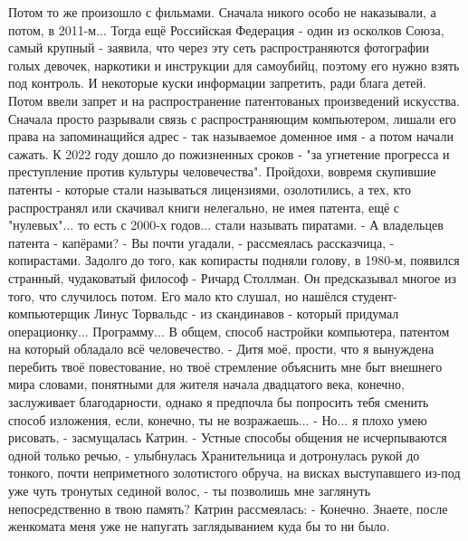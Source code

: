 Потом то же произошло с фильмами. Сначала никого особо не наказывали, а потом, в 2011-м... Тогда ещё Российская Федерация - один из осколков Союза, самый крупный - заявила, что через эту сеть распространяются фотографии голых девочек, наркотики и инструкции для самоубийц, поэтому его нужно взять под контроль. И некоторые куски информации запретить, ради блага детей. Потом ввели запрет и на распространение патентованых произведений искусства. Сначала просто разрывали связь с распространяющим компьютером, лишали его права на запоминащийся адрес - так называемое доменное имя - а потом начали сажать. К 2022 году дошло до пожизненных сроков - "за угнетение прогресса и преступление против культуры человечества". Пройдохи, вовремя скупившие патенты - которые стали называться лицензиями, озолотились, а тех, кто распространял или скачивал книги нелегально, не имея патента, ещё с "нулевых"... то есть с 2000-х годов... стали называть пиратами.
 - А владельцев патента - капёрами?
 - Вы почти угадали, - рассмеялась рассказчица, - копирастами. Задолго до того, как копирасты подняли голову, в 1980-м, появился странный, чудаковатый философ - Ричард Столлман. Он предсказывал многое из того, что случилось потом. Его мало кто слушал, но нашёлся студент-компьютерщик Линус Торвальдс - из скандинавов - который придумал операционку... Программу... В общем, способ настройки компьютера, патентом на который обладало всё человечество.
 - Дитя моё, прости, что я вынуждена перебить твоё повестование, но твоё стремление объяснить мне быт внешнего мира словами, понятными для жителя начала двадцатого века, конечно, заслуживает благодарности, однако я предпочла бы попросить тебя сменить способ изложения, если, конечно, ты не возражаешь...
 - Но... я плохо умею рисовать, - засмущалась Катрин.
 - Устные способы общения не исчерпываются одной только речью, - улыбнулась Хранительница и дотронулась рукой до тонкого, почти неприметного золотистого обруча, на висках выступавшего из-под уже чуть тронутых сединой волос, - ты позволишь мне заглянуть непосредственно в твою память?
Катрин рассмеялась:
 - Конечно. Знаете, после женкомата меня уже не напугать заглядыванием куда бы то ни было.

